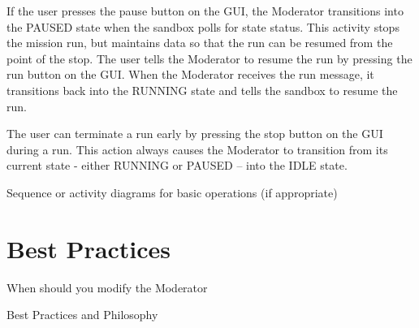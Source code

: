 If the user presses the pause button on the GUI, the Moderator transitions into the PAUSED state
when the sandbox polls for state status.  This activity stops the mission run, but maintains data so
that the run can be resumed from the point of the stop.  The user tells the Moderator to resume the
run by pressing the run button on the GUI.  When the Moderator receives the run message, it
transitions back into the RUNNING state and tells the sandbox to resume the run.

The user can terminate a run early by pressing the stop button on the GUI during a run.  This action
always causes the Moderator to transition from its current state - either RUNNING or PAUSED -- into
the IDLE state.


Sequence or activity diagrams for basic operations (if appropriate)


\section{Best Practices}

When should you modify the Moderator

Best Practices and Philosophy
